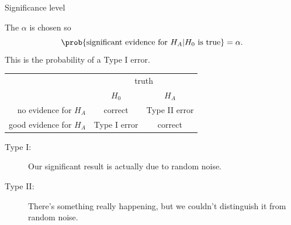 \begin{frame}{Significance level}

    The  $\alpha$ is chosen so
    \[
        \prob \{ \text{significant evidence for $H_A$} | \text{$H_0$ is true} \} = \alpha .
    \]
    This is the probability of a \alert{Type I error}.


    \vspace{2em}

    \begin{tabular}{r|cc}
        & \multicolumn{2}{c}{truth} \\
        & $H_0$ & $H_A$ \\
        \hline
        no evidence for $H_A$ & correct & Type II error \\
        good evidence for $H_A$ & Type I error & correct \\
    \end{tabular}

    \vspace{2em}

    \begin{description}
        \item[Type I:] Our significant result is actually due to random noise.
        \item[Type II:] There's something really happening, but we couldn't distinguish it from random noise.
    \end{description}

\end{frame}

